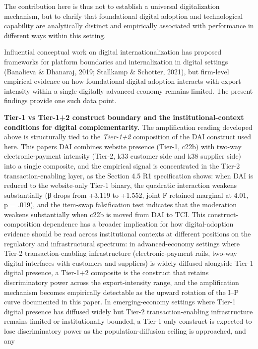\documentclass[12pt,a4paper]{article}
\begin{document}
The contribution here is thus not to establish a universal
digitalization mechanism, but to clarify that foundational digital
adoption and technological capability are analytically distinct and
empirically associated with performance in different ways within this
setting.

Influential conceptual work on digital internationalization has proposed
frameworks for platform boundaries and internalization in digital
settings (Banalieva \& Dhanaraj, 2019; Stallkamp \& Schotter, 2021), but
firm-level empirical evidence on how foundational digital adoption
interacts with export intensity within a single digitally advanced
economy remains limited. The present findings provide one such data
point.

\textbf{Tier-1 vs Tier-1+2 construct boundary and the
institutional-context conditions for digital complementarity.} The
amplification reading developed above is structurally tied to the
\emph{Tier-1+2} composition of the DAI construct used here. This
paper\textquotesingle s DAI combines website presence (Tier-1, c22b)
with two-way electronic-payment intensity (Tier-2, k33 customer side and
k38 supplier side) into a single composite, and the empirical signal is
concentrated in the Tier-2 transaction-enabling layer, as the Section
4.5 R1 specification shows: when DAI is reduced to the website-only
Tier-1 binary, the quadratic interaction weakens substantially (β drops
from +3.119 to +1.552, joint F retained marginal at 4.01, p = .019), and
the item-swap falsification test indicates that the moderation weakens
substantially when c22b is moved from DAI to TCI. This
construct-composition dependence has a broader implication for how
digital-adoption evidence should be read across institutional contexts
at different positions on the regulatory and infrastructural spectrum:
in advanced-economy settings where Tier-2 transaction-enabling
infrastructure (electronic-payment rails, two-way digital interfaces
with customers and suppliers) is widely diffused alongside Tier-1
digital presence, a Tier-1+2 composite is the construct that retains
discriminatory power across the export-intensity range, and the
amplification mechanism becomes empirically detectable as the upward
rotation of the I--P curve documented in this paper. In emerging-economy
settings where Tier-1 digital presence has diffused widely but Tier-2
transaction-enabling infrastructure remains limited or institutionally
bounded, a Tier-1-only construct is expected to lose discriminatory
power as the population-diffusion ceiling is approached, and any
\end{document}
